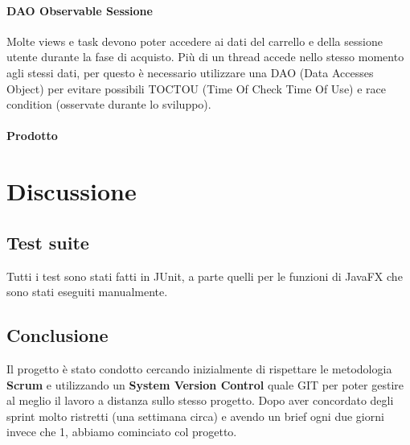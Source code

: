 \documentclass[12pt, a4paper]{report}
\begin{document}
\subsubsection{DAO Observable Sessione}
Molte views e task devono poter accedere ai dati del carrello e della sessione utente durante la fase di acquisto. 
Più di un thread accede nello stesso momento agli stessi dati, per questo è necessario utilizzare una DAO (Data Accesses Object) per evitare possibili TOCTOU (Time Of Check Time Of Use) e race condition (osservate durante lo sviluppo).


\subsubsection{Prodotto}



\chapter{Discussione}

\section{Test suite}

Tutti i test sono stati fatti in JUnit, a parte quelli per le funzioni di JavaFX
che sono stati eseguiti manualmente.


\section{Conclusione}
Il progetto è stato condotto cercando inizialmente di rispettare le metodologia
\textbf{Scrum} e utilizzando un \textbf{System Version Control} quale GIT per 
poter gestire al meglio il lavoro a distanza sullo stesso progetto. Dopo aver
concordato degli sprint molto ristretti (una settimana circa) e avendo un brief
ogni due giorni invece che 1, abbiamo cominciato col progetto.
\end{document}
